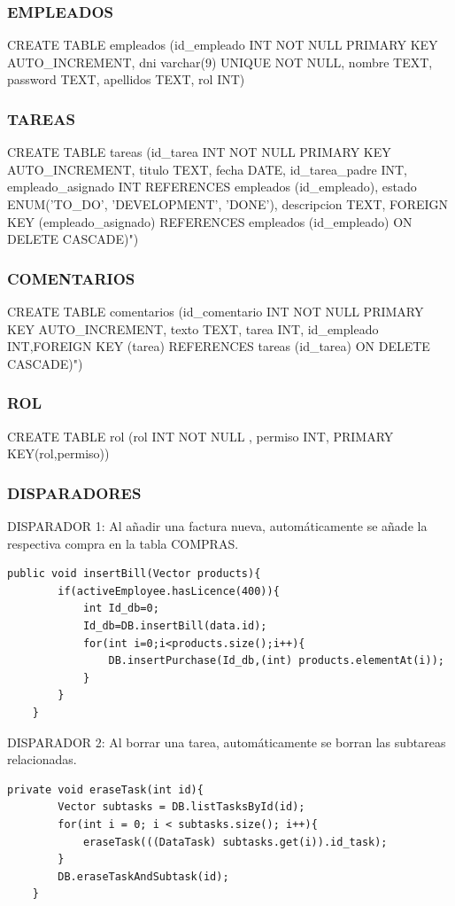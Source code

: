 \documentclass[paper=a4, fontsize=11pt, spanish]{scrartcl}
\begin{document}
\subsubsection *{EMPLEADOS}
CREATE TABLE empleados (id\_empleado INT NOT NULL PRIMARY KEY AUTO\_INCREMENT, dni varchar(9) UNIQUE NOT NULL,  nombre TEXT, password TEXT, apellidos TEXT, rol INT)

\subsubsection *{TAREAS}
CREATE TABLE tareas (id\_tarea INT NOT NULL PRIMARY KEY AUTO\_INCREMENT, titulo TEXT, fecha DATE, id\_tarea\_padre INT, empleado\_asignado INT REFERENCES empleados (id\_empleado), estado ENUM('TO\_DO', 'DEVELOPMENT', 'DONE'), descripcion TEXT, FOREIGN KEY (empleado\_asignado) REFERENCES empleados (id\_empleado) ON DELETE CASCADE)")

\subsubsection *{COMENTARIOS}
CREATE TABLE comentarios (id\_comentario INT NOT NULL PRIMARY KEY AUTO\_INCREMENT, texto TEXT, tarea INT, id\_empleado INT,FOREIGN KEY (tarea) REFERENCES tareas (id\_tarea) ON DELETE CASCADE)")

\subsubsection *{ROL}
CREATE TABLE rol (rol INT NOT NULL , permiso INT, PRIMARY KEY(rol,permiso))

\subsubsection{DISPARADORES}
DISPARADOR 1:
\newline
Al añadir una factura nueva, automáticamente se añade la respectiva compra en la tabla COMPRAS.
\lstset{language=C, breaklines=true, basicstyle=\footnotesize}
\begin{lstlisting}[frame=single]
    public void insertBill(Vector products){
        if(activeEmployee.hasLicence(400)){
            int Id_db=0;
            Id_db=DB.insertBill(data.id);
            for(int i=0;i<products.size();i++){
                DB.insertPurchase(Id_db,(int) products.elementAt(i));
            }
        }
    }
\end{lstlisting}
\newpage
DISPARADOR 2:
\newline
Al borrar una tarea, automáticamente se borran las subtareas relacionadas.
\lstset{language=C, breaklines=true, basicstyle=\footnotesize}
\begin{lstlisting}[frame=single]
    private void eraseTask(int id){
        Vector subtasks = DB.listTasksById(id);
        for(int i = 0; i < subtasks.size(); i++){
            eraseTask(((DataTask) subtasks.get(i)).id_task);
        }
        DB.eraseTaskAndSubtask(id);
    }
\end{lstlisting}
\end{document}
